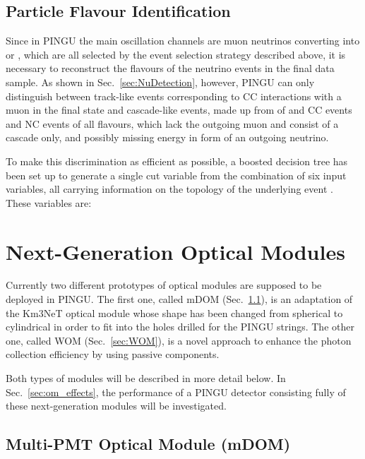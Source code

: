 \subsection{Particle Flavour Identification}
\label{sec:cuts_PID}

Since in PINGU the main oscillation channels are muon neutrinos converting into
\nue or \nutau, which are all selected by the event selection strategy
described above, it is necessary to reconstruct the flavours of the neutrino
events in the final data sample. As shown in Sec.~\ref{sec:NuDetection},
however, PINGU can only distinguish between track-like events corresponding to
\numu CC interactions with a muon in the final state and cascade-like events,
made up from of \nue and \nutau CC events and NC events of all flavours,
which lack the outgoing muon and consist of a cascade only, and possibly
missing energy in form of an outgoing neutrino.

To make this discrimination as efficient as possible, a boosted decision tree
\cite{BDT} has been set up to generate a single cut variable from the
combination of six input variables, all carrying information on the topology of
the underlying event \cite{PID_BDT}. These variables are:


\section{Next-Generation Optical Modules}
\label{sec:Gen2DOM}

Currently two different prototypes of optical modules are supposed to be
deployed in PINGU. The first one, called mDOM (Sec.~\ref{sec:mDOM}), is an
adaptation of the Km3NeT optical module \cite{Km3NeTmodule} whose shape has been
changed from spherical to cylindrical in order to fit into the holes drilled for
the PINGU strings. The other one, called WOM (Sec.~\ref{sec:WOM}), is a novel
approach to enhance the photon collection efficiency by using passive
components.

Both types of modules will be described in more detail below. In
Sec.~\ref{sec:om_effects}, the performance of a PINGU detector consisting fully
of these next-generation modules will be investigated.

\subsection{Multi-PMT Optical Module (mDOM)}
\label{sec:mDOM}

